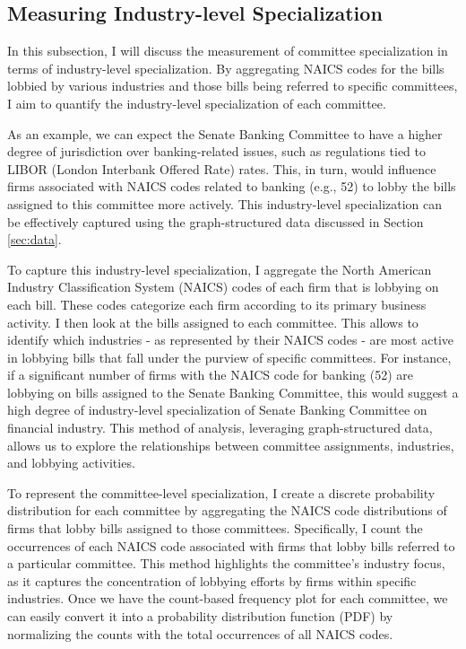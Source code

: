 \documentclass[15pt,letterpaper]{article}
\begin{document}
\subsection{Measuring Industry-level Specialization}

In this subsection, I will discuss the measurement of committee specialization in terms of industry-level specialization. By aggregating NAICS codes for the bills lobbied by various industries and those bills being referred to specific committees, I aim to quantify the industry-level specialization of each committee.

As an example, we can expect the Senate Banking Committee to have a higher degree of jurisdiction over banking-related issues, such as regulations tied to LIBOR (London Interbank Offered Rate) rates. This, in turn, would influence firms associated with NAICS codes related to banking (e.g., 52) to lobby the bills assigned to this committee more actively. This industry-level specialization can be effectively captured using the graph-structured data discussed in Section \ref{sec:data}. 

To capture this industry-level specialization, I aggregate the North American Industry Classification System (NAICS) codes of each firm that is lobbying on each bill. These codes categorize each firm according to its primary business activity. I then look at the bills assigned to each committee. This allows to identify which industries - as represented by their NAICS codes - are most active in lobbying bills that fall under the purview of specific committees.
For instance, if a significant number of firms with the NAICS code for banking (52) are lobbying on bills assigned to the Senate Banking Committee, this would suggest a high degree of industry-level specialization of Senate Banking Committee on financial industry. This method of analysis, leveraging graph-structured data, allows us to explore the relationships between committee assignments, industries, and lobbying activities. 



To represent the committee-level specialization, I create a discrete probability distribution for each committee by aggregating the NAICS code distributions of firms that lobby bills assigned to those committees. Specifically, I count the occurrences of each NAICS code associated with firms that lobby bills referred to a particular committee. This method highlights the committee's industry focus, as it captures the concentration of lobbying efforts by firms within specific industries. Once we have the count-based frequency plot for each committee, we can easily convert it into a probability distribution function (PDF) by normalizing the counts with the total occurrences of all NAICS codes.
\end{document}

